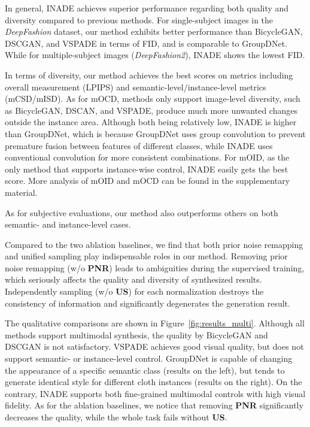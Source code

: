 \documentclass[final]{cvpr}
\begin{document}
In general, INADE achieves superior performance regarding both quality and diversity compared to previous methods. 
For single-subject images in the \textit{DeepFashion} dataset, our method exhibits better performance than BicycleGAN, DSCGAN, and VSPADE in terms of FID, and is comparable to GroupDNet. While for multiple-subject images (\textit{DeepFashion2}), INADE shows the lowest FID.

In terms of diversity, our method achieves the best scores on metrics including overall measurement (LPIPS) and semantic-level/instance-level metrics (mCSD/mISD). As for mOCD, methods only support image-level diversity, such as BicycleGAN, DSCAN, and VSPADE, produce much more unwanted changes outside the instance area. Although both being relatively low, INADE is higher than GroupDNet, which is because GroupDNet uses group convolution to prevent premature fusion between features of different classes, while INADE uses conventional convolution for more consistent combinations. 
For mOID, as the only method that supports instance-wise control, INADE easily gets the best score. More analysis of mOID and mOCD can be found in the supplementary material.

As for subjective evaluations, our method also outperforms others on both semantic- and instance-level cases. 

Compared to the two ablation baselines, we find that both prior noise remapping and unified sampling play indispensable roles in our method. Removing prior noise remapping (w/o \textbf{PNR}) leads to ambiguities during the supervised training, which seriously affects the quality and diversity of synthesized results. Independently sampling (w/o \textbf{US}) for each normalization destroys the consistency of information and significantly degenerates the generation result.

The qualitative comparisons are shown in Figure~\ref{fig:results_multi}. Although all methods support multimodal synthesis, the quality by BicycleGAN and DSCGAN is not satisfactory. VSPADE achieves good visual quality, but does not support semantic- or instance-level control. GroupDNet is capable of changing the appearance of a specific semantic class (results on the left), but tends to generate identical style for different cloth instances (results on the right). On the contrary, INADE supports both fine-grained multimodal controls with high visual fidelity. As for the ablation baselines, we notice that removing \textbf{PNR} significantly decreases the quality, while the whole task fails without \textbf{US}. 
\end{document}
